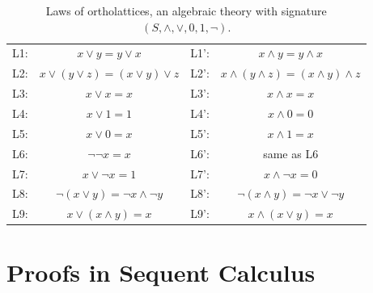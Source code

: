 \begin{table}[bth]
  \centering
  \begin{tabular}{r c @{\hskip 2em} | @{\hskip 2em} r c}
    L1: & $x \lor y = y \lor x$                    & L1': & $x \land y = y \land x$                      \\
    L2: & $x \lor ( y \lor z) = (x \lor y) \lor z$ & L2': & $x \land ( y \land z) = (x \land y) \land z$ \\
    L3: & $x \lor x = x$                           & L3': & $x \land x = x$                              \\
    L4: & $x \lor 1 = 1$                           & L4': & $x \land 0 = 0$                              \\
    L5: & $x \lor 0 = x$                           & L5': & $x \land 1 = x$                              \\
    L6: & $\neg \neg x = x$                        & L6': & same as L6                                   \\
    L7: & $x \lor \neg x = 1$                      & L7': & $x \land \neg x = 0$                         \\
    L8: & $\neg (x \lor y) = \neg x \land \neg y$  & L8': & $\neg (x \land y) = \neg x \lor \neg y$      \\
    L9: & $x \lor (x \land y) = x$                 & L9': & $x \land (x \lor y) = x$                     \\
  \end{tabular}
  \caption{Laws of ortholattices, an algebraic theory with signature $(S, \land, \lor, 0, 1, \neg)$. \cite{Guilloud:297701}}
  \label{tab:ortholatticeLaws}
\end{table}


\section{Proofs in Sequent Calculus}
\label{sect:proofs_lk}
